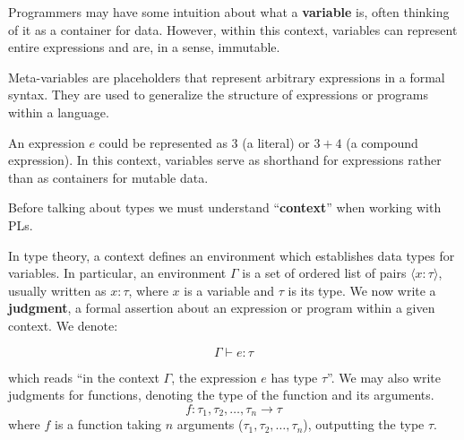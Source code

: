 \newpage

\noindent
Programmers may have some intuition about what a \textbf{variable} is, often thinking of it as a container for data.
However, within this context, variables can represent entire expressions and are, in a sense, immutable.
\begin{Def}

    Meta-variables are placeholders that represent arbitrary expressions in a formal syntax.
    They are used to generalize the structure of expressions or programs within a language.
\end{Def}

\vspace{-1em}
\begin{Example}

    An expression $e$ could be represented as $3$ (a literal) or $3 + 4$ (a compound expression).
    In this context, variables serve as shorthand for expressions rather than as containers for mutable data.
\end{Example}

\noindent
Before talking about types we must understand ``\textbf{context}'' when working with PLs.


\begin{Def}

    In type theory, a context defines an environment which establishes data types for variables.
    In particular, an environment $\Gamma$ is a set of ordered list of pairs $\langle x : \tau \rangle$, usually written as $x : \tau$,
    where $x$ is a variable and $\tau$ is its type. We now write a \textbf{judgment},
    a formal assertion about an expression or program within a given context. We denote:\LARGE

    \vspace{-1em}
    \[\Gamma \vdash e: \tau\]

    \normalsize 
    \noindent
    which reads ``in the context $\Gamma$, the expression $e$ has type $\tau$''. 
    We may also write judgments for functions, denoting the type of the function and its arguments.
    \LARGE
    \[ f : \tau_1, \tau_2, \ldots, \tau_n \rightarrow \tau \]
    \normalsize
    \noindent 
    where $f$ is a function taking $n$ arguments ($\tau_1, \tau_2, \ldots, \tau_n$), outputting the type $\tau$.
    
    \hfill \cite{WikipediaTypingEnvironment}
\end{Def}

